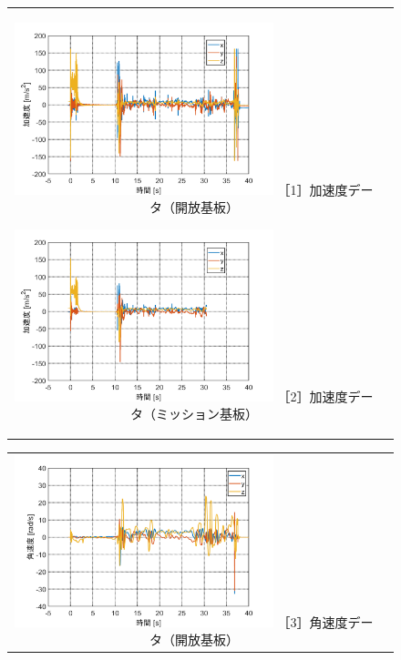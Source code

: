 \documentclass[a4paper,11pt,titlepage,uplatex]{jsarticle}
\begin{document}
\begin{figure}[H]
    \begin{tabular}{cc}
        \begin{minipage}{.48\textwidth}
            \centering
            \includegraphics[width=75mm]{pic_sim/acc_no.png}
            \hspace{16mm} {\small［1］加速度データ（開放基板）}
        \end{minipage}
        \begin{minipage}{.48\textwidth}
            \centering
            \includegraphics[width=75mm]{pic_sim/acc_ta.png}
            \hspace{16mm} {\small［2］加速度データ（ミッション基板）}
        \end{minipage}
    \end{tabular}
    \begin{tabular}{cc}
        \begin{minipage}{.48\textwidth}
            \centering
            \includegraphics[width=75mm]{pic_sim/gyr_no.png}
            \hspace{16mm} {\small［3］角速度データ（開放基板）}

\end{minipage}
\end{tabular}
\end{figure}
\end{document}
